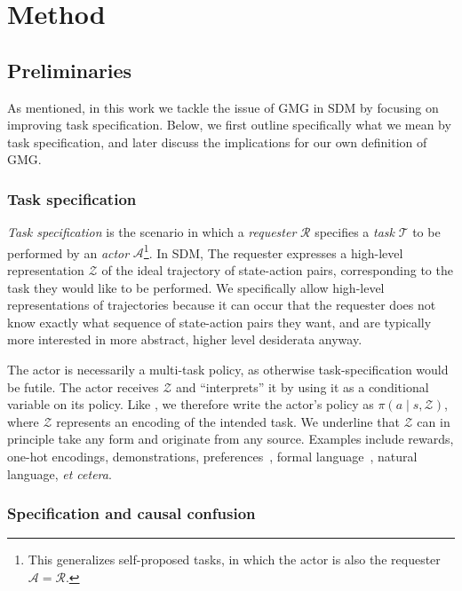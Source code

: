 \documentclass[../main.tex]{subfiles}
\begin{document}
\chapter{Method}\label{meth:chap}

\section{Preliminaries}\label{chap:prel}

As mentioned, in this work we tackle the issue of GMG in SDM by focusing on improving task
specification. Below, we first outline specifically what we mean by task specification, and later
discuss the implications for our own definition of GMG.

\subsection{Task specification}\label{prel:sec:task-spec}

\emph{Task specification} is the scenario in which a \textit{requester} $\mathcal{R}$ specifies
a \textit{task} $\mathcal{T}$ to be performed by an \textit{actor} $\mathcal{A}$\footnote{This
	generalizes self-proposed tasks, in which the actor is also the requester
	$\mathcal{A}=\mathcal{R}$.}. In SDM, The requester expresses a high-level representation
$\mathcal{Z}$ of the ideal trajectory of state-action pairs, corresponding to the task they
would like to be performed. We specifically allow high-level representations of trajectories because
it can occur that the requester does not know exactly what sequence of state-action pairs they want,
and are typically more interested in more abstract, higher level desiderata anyway.

The actor is necessarily a multi-task policy, as otherwise task-specification would be futile. The
actor receives $\mathcal{Z}$ and ``interprets'' it by using it as a conditional variable on its
policy. Like \citet{cho_multi-task_2022}, we therefore write the actor's policy as $\pi(a \mid s,
	\mathcal{Z})$, where $\mathcal{Z}$ represents an encoding of the intended task. We underline that
$\mathcal{Z}$ can in principle take any form and originate from any source. Examples include
rewards, one-hot encodings, demonstrations, preferences~\citep{christiano_deep_2017}, formal
language~\citep{bansal_specification-guided_2022}, natural language, \textit{et cetera}.

\subsection{Specification and causal confusion}\label{meth:sec:spec_causal}
\end{document}
